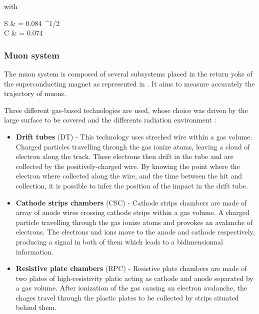         with

        {
            S & = 0.084~^{1/2} \\
            C & = 0.074\nonumber
        }


            \subsubsection{Muon system}

        The muon system is composed of several subsystems placed in the return yoke of
        the superconducting magnet as represented in . It aims to
        measure accurately the trajectory of muons.


        Three different gas-based technologies are used, whose choice was driven by the
        large surface to be covered and the differents radiation environment :
        \begin{itemize}
            \item \textbf{Drift tubes} (DT) - This technology uses streched wire within
                a gas volume. Charged particles travelling through the gas ionize atoms,
                leaving a cloud of electron along the track. These electrons then drift
                in the tube and are collected by the positively-charged wire. By knowing
                the point where the electron where collected along the wire, and the
                time between the hit and collection, it is possible to infer the position
                of the impact in the drift tube.
            \item \textbf{Cathode strips chambers} (CSC) - Cathode strips chambers are
                made of array of anode wires crossing cathode strips within a gas volume.
                A charged particle travelling through the gas ionize atoms and provokes an
                avalanche of electrons. The electrons and ions move to the anode and
                cathode respectively, producing a signal in both of them which leads to
                a bidimensionnal information.
            \item \textbf{Resistive plate chambers} (RPC) - Resistive plate chambers are
                made of two plates of high-resistivity platic acting as cathode and anode
                separated by a gas volume. After ionization of the gas causing an
                electron avalanche, the chages travel through the plastic plates to be
                collected by strips situated behind them.
        \end{itemize}

